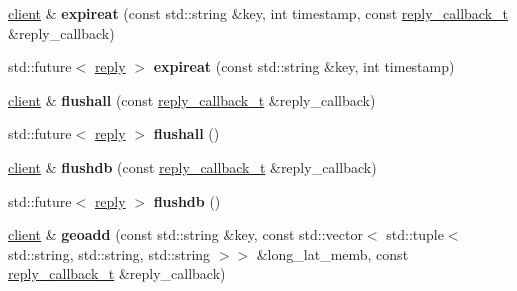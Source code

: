 \begin{DoxyCompactItemize}
\item 
\mbox{\label{classcpp__redis_1_1client_a7b5e1b089d68a0cb71f72fb6aecb0a63}} 
\hyperlink{classcpp__redis_1_1client}{client} \& {\bfseries expireat} (const std\+::string \&key, int timestamp, const \hyperlink{classcpp__redis_1_1client_a061a1140d36d2eaeda82b09a0bb3f9f2}{reply\+\_\+callback\+\_\+t} \&reply\+\_\+callback)
\item 
\mbox{\label{classcpp__redis_1_1client_af344a8ae784f7d4d529ea9cab276906c}} 
std\+::future$<$ \hyperlink{classcpp__redis_1_1reply}{reply} $>$ {\bfseries expireat} (const std\+::string \&key, int timestamp)
\item 
\mbox{\label{classcpp__redis_1_1client_a64e5730ff850ce517709e4e7fc511309}} 
\hyperlink{classcpp__redis_1_1client}{client} \& {\bfseries flushall} (const \hyperlink{classcpp__redis_1_1client_a061a1140d36d2eaeda82b09a0bb3f9f2}{reply\+\_\+callback\+\_\+t} \&reply\+\_\+callback)
\item 
\mbox{\label{classcpp__redis_1_1client_a78f879507f060ba538de5db80a5e3009}} 
std\+::future$<$ \hyperlink{classcpp__redis_1_1reply}{reply} $>$ {\bfseries flushall} ()
\item 
\mbox{\label{classcpp__redis_1_1client_a8334064cd300cb19f0760ad7c4c84673}} 
\hyperlink{classcpp__redis_1_1client}{client} \& {\bfseries flushdb} (const \hyperlink{classcpp__redis_1_1client_a061a1140d36d2eaeda82b09a0bb3f9f2}{reply\+\_\+callback\+\_\+t} \&reply\+\_\+callback)
\item 
\mbox{\label{classcpp__redis_1_1client_acd8cea192338f42f601ea8fce5c8048c}} 
std\+::future$<$ \hyperlink{classcpp__redis_1_1reply}{reply} $>$ {\bfseries flushdb} ()
\item 
\mbox{\label{classcpp__redis_1_1client_acb21c6730ed40799cef06315db231409}} 
\hyperlink{classcpp__redis_1_1client}{client} \& {\bfseries geoadd} (const std\+::string \&key, const std\+::vector$<$ std\+::tuple$<$ std\+::string, std\+::string, std\+::string $>$$>$ \&long\+\_\+lat\+\_\+memb, const \hyperlink{classcpp__redis_1_1client_a061a1140d36d2eaeda82b09a0bb3f9f2}{reply\+\_\+callback\+\_\+t} \&reply\+\_\+callback)
$$
\end{DoxyCompactItemize}
